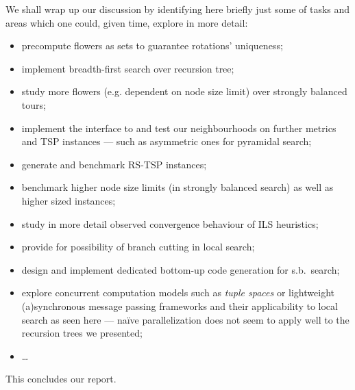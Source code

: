 \documentclass[titlepage,twoside,index=totoc,bibliography=totoc]{scrartcl}
\numberwithin{equation}{section}
\numberwithin{figure}{section}
\numberwithin{table}{section}
\let\defstyle\itshape
\begin{document}
We shall wrap up our discussion by identifying here briefly just some of tasks
and areas which one could, given time, explore in more detail:
\begin{itemize}
  \item
    precompute flowers as sets to guarantee rotations' uniqueness;
  \item
    implement breadth-first search over recursion tree;
  \item
    study more flowers (e.g. dependent on node size limit) over strongly balanced tours;
  \item
    implement the interface to and test our neighbourhoods on further metrics
    and TSP instances --- such as asymmetric ones for pyramidal search;
  \item
    generate and benchmark RS-TSP instances;
  \item
    benchmark higher node size limits (in strongly balanced search) as well as higher sized instances;
  \item
    study in more detail observed convergence behaviour of ILS heuristics;
  \item
    provide for possibility of branch cutting in local search;
  \item
    design and implement dedicated bottom-up code generation for s.b.\ search;
  \item
    explore concurrent computation models
    such as {\defstyle tuple spaces} or
    lightweight (a)synchronous message passing frameworks
    and their applicability to local search as seen here ---
    naïve parallelization does not seem to apply well to the
    recursion trees we presented;
  \item
    \ldots
\end{itemize}
This concludes our report.

\begin{center}
\vspace{2em}
\vspace{2em}
\end{center}
\clearpage

\end{document}
